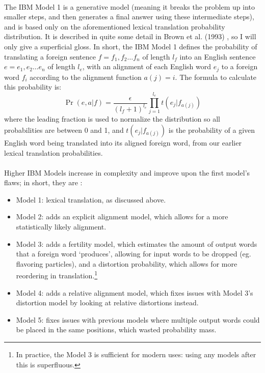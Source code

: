  \paragraph{}{The IBM Model 1 is a generative model (meaning it breaks
   the problem up into smaller steps, and then generates a final
   answer using these intermediate steps), and is based only on the
   aforementioned lexical translation probability distribution. It is
   described in quite some detail in Brown et al. (1993) \cite{m1}, so
   I will only give a superficial gloss. In short, the IBM Model 1
   defines the probability of translating a foreign sentence
   $f = f_1, f_2 \dots f_n$ of length $l_f$ into an English sentence
   $e = e_1, e_2 \dots e_n$ of length $l_e$, with an alignment of each
   English word $e_j$ to a foreign word $f_i$ according to the
   alignment function $a(j) = i$. The formula to calculate this probability is:
   $$ \Pr(e, a|f) =
   \frac{\epsilon}{(l_f + 1)^{l_e}} \prod_{j=1}^{l_e}t(e_j|f_{a(j)})$$
   where the leading fraction is used to normalize the distribution so
   all probabilities are between 0 and 1, and $t(e_j|f_{a(j)})$ is the
   probability of a given English word being translated into its
   aligned foreign word, from our earlier lexical translation
   probabilities. }
 \paragraph{}{Higher IBM Models increase in complexity and improve
   upon the first model's flaws; in short, they are \cite{smt}:}
 \begin{itemize}
 \item Model 1: lexical translation, as discussed above.
 \item Model 2: adds an explicit alignment model, which allows for a
   more statistically likely alignment.
 \item Model 3: adds a fertility model, which estimates the amount of
   output words that a foreign word `produces', allowing for input
   words to be dropped (eg. flavoring particles), and a distortion
   probability, which allows for more reordering in
   translation.\footnote{In practice, the Model 3 is sufficient for
     modern uses: using any models after this is superfluous.}
 \item Model 4: adds a relative alignment model, which fixes issues
   with Model 3's distortion model by looking at relative distortions
   instead.
 \item Model 5: fixes issues with previous models where multiple
   output words could be placed in the same positions, which wasted
   probability mass.
 \end{itemize}


